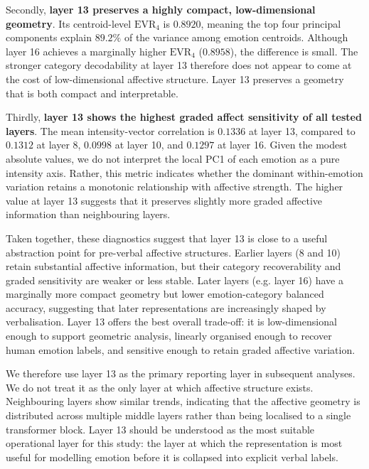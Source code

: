 Secondly, \textbf{layer 13 preserves a highly compact, low-dimensional geometry}. Its centroid-level $\mathrm{EVR}_{4}$ is $0.8920$, meaning the top four principal components explain $89.2\%$ of the variance among emotion centroids. Although layer 16 achieves a marginally higher $\mathrm{EVR}_{4}$ ($0.8958$), the difference is small. The stronger category decodability at layer 13 therefore does not appear to come at the cost of low-dimensional affective structure. Layer 13 preserves a geometry that is both compact and interpretable.\par

Thirdly, \textbf{layer 13 shows the highest graded affect sensitivity of all tested layers}. The mean intensity-vector correlation is $0.1336$ at layer 13, compared to $0.1312$ at layer 8, $0.0998$ at layer 10, and $0.1297$ at layer 16. Given the modest absolute values, we do not interpret the local PC1 of each emotion as a pure intensity axis. Rather, this metric indicates whether the dominant within-emotion variation retains a monotonic relationship with affective strength. The higher value at layer 13 suggests that it preserves slightly more graded affective information than neighbouring layers.\par

Taken together, these diagnostics suggest that layer 13 is close to a useful abstraction point for pre-verbal affective structures. Earlier layers (8 and 10) retain substantial affective information, but their category recoverability and graded sensitivity are weaker or less stable. Later layers (e.g. layer 16) have a marginally more compact geometry but lower emotion-category balanced accuracy, suggesting that later representations are increasingly shaped by verbalisation. Layer 13 offers the best overall trade-off: it is low-dimensional enough to support geometric analysis, linearly organised enough to recover human emotion labels, and sensitive enough to retain graded affective variation.\par

We therefore use layer 13 as the primary reporting layer in subsequent analyses. We do not treat it as the only layer at which affective structure exists. Neighbouring layers show similar trends, indicating that the affective geometry is distributed across multiple middle layers rather than being localised to a single transformer block. Layer 13 should be understood as the most suitable operational layer for this study: the layer at which the representation is most useful for modelling emotion before it is collapsed into explicit verbal labels.\par

